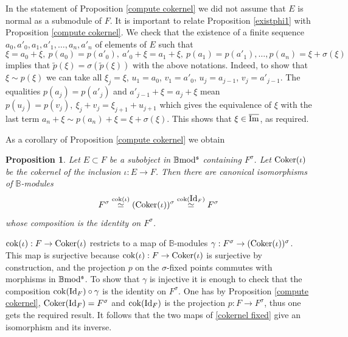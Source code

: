 \documentclass[12pt]{article}
\newtheorem{prop}[thm]{Proposition}
\def\id{{\rm id}}
\def\coker{{\rm Coker}}
\def\scoker{{\rm cok}}
\def\B{{\mathbb B}}
\def\imm{\overline{\rm Im}}
\def\id{{\mbox{Id}}}
\def\b2{{\rm \B mod^{\mathfrak s}}}
\begin{document}
 In the statement of Proposition \ref{compute cokernel} we did not assume that $E$ is normal as a submodule of $F$. It is important to relate Proposition \ref{existphi1} with  Proposition \ref{compute cokernel}. We check that the existence of a finite sequence $a_0,a'_0,a_1,a'_1,\ldots, a_n,a'_n$ of elements of $E$ such that 
 $$
 \xi=a_0+\xi,\ p(a_0)=p(a'_0),\ a'_0+\xi=a_1+\xi,\ p(a_1)=p(a'_1), \ldots, p(a_n)=\xi+\sigma(\xi)
 $$
implies that $\tilde p(\xi)=\sigma(\tilde p(\xi))$ with the above notations. Indeed, to show that $\xi\sim p(\xi)$ we can take all $\xi_j=\xi$, $u_1=a_0$, $v_1=a'_0$, $u_j=a_{j-1}$, $v_j=a'_{j-1}$. The equalities $p(a_j)=p(a'_j)$ and  $a'_{j-1}+\xi=a_j+\xi$ mean $p(u_j)=p(v_j), \  \xi_j+v_j=\xi_{j+1}+u_{j+1}$ which gives the equivalence of $\xi$ with the last term $a_n+\xi\sim p(a_n)+\xi=\xi+\sigma(\xi)$. This shows that $\xi\in \imm$, as required. 

As a corollary  of Proposition \ref{compute cokernel} we obtain
\begin{prop}\label{fixed cokernel} Let $E\subset F$ be a subobject in $\b2$ containing $F^\sigma$. Let $\coker(\iota)$ be the cokernel of the inclusion $\iota:E\to F$.  Then there are canonical isomorphisms of $\B$-modules 
   \begin{equation}\label{cokernel fixed}
   F^\sigma\stackrel{\scoker(\iota)}{\simeq}(\coker(\iota))^\sigma \stackrel{\scoker(\id_F)}{\simeq}F^\sigma
  \end{equation} 
  whose composition is the identity on $F^\sigma$.
   \end{prop}
   \proof $\scoker(\iota):F\to \coker(\iota)$ restricts to a map of $\B$-modules $\gamma:F^\sigma\to (\coker(\iota))^\sigma$. This map is surjective because $\scoker(\iota):F\to \coker(\iota)$ is surjective by construction, and the projection $p$ on the $\sigma$-fixed points commutes with morphisms in $\b2$. To show that $\gamma$ is injective it is enough to check that the composition $\scoker(\id_F)\circ \gamma$ is the identity on $F^\sigma$. One has by Proposition \ref{compute cokernel},  $\coker(\id_F)=F^\sigma$ and $\scoker(\id_F)$ is the projection $p:F\to F^\sigma$, thus one gets the required result. It follows that the two maps of \eqref{cokernel fixed} give an isomorphism and its inverse. \endproof
   
\end{document}
